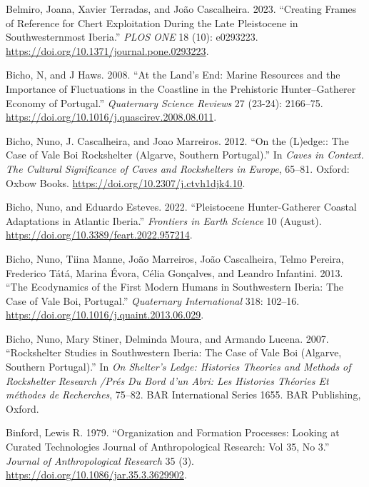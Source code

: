 \documentclass[
  a4paper,
  DIV=11,
  numbers=noendperiod]{scrreprt}
\newlength{\cslhangindent}
\newenvironment{CSLReferences}[2] %
 {\begin{list}{}{%
  \setlength{\itemindent}{0pt}
  \setlength{\leftmargin}{0pt}
  \setlength{\parsep}{0pt}
  \ifodd #1
   \setlength{\leftmargin}{\cslhangindent}
   \setlength{\itemindent}{-1\cslhangindent}
  \fi
  \setlength{\itemsep}{#2\baselineskip}}}
 {\end{list}}
\begin{document}
\begin{CSLReferences}{1}{0}
Belmiro, Joana, Xavier Terradas, and João Cascalheira. 2023. {``Creating
Frames of Reference for Chert Exploitation During the {Late Pleistocene}
in {Southwesternmost Iberia}.''} \emph{PLOS ONE} 18 (10): e0293223.
\url{https://doi.org/10.1371/journal.pone.0293223}.

Bicho, N, and J Haws. 2008. {``At the Land's End: {Marine} Resources and
the Importance of Fluctuations in the Coastline in the Prehistoric
Hunter--Gatherer Economy of {Portugal}.''} \emph{Quaternary Science
Reviews} 27 (23-24): 2166--75.
\url{https://doi.org/10.1016/j.quascirev.2008.08.011}.

Bicho, Nuno, J. Cascalheira, and Joao Marreiros. 2012. {``On the
({L})edge:: {The Case} of {Vale Boi Rockshelter} ({Algarve}, {Southern
Portugal}).''} In \emph{Caves in {Context}. {The Cultural Significance}
of {Caves} and {Rockshelters} in {Europe}}, 65--81. Oxford: Oxbow Books.
\url{https://doi.org/10.2307/j.ctvh1djk4.10}.

Bicho, Nuno, and Eduardo Esteves. 2022. {``Pleistocene Hunter-Gatherer
Coastal Adaptations in {Atlantic Iberia}.''} \emph{Frontiers in Earth
Science} 10 (August). \url{https://doi.org/10.3389/feart.2022.957214}.

Bicho, Nuno, Tiina Manne, João Marreiros, João Cascalheira, Telmo
Pereira, Frederico Tátá, Marina Évora, Célia Gonçalves, and Leandro
Infantini. 2013. {``The Ecodynamics of the First Modern Humans in
{Southwestern Iberia}: {The} Case of {Vale Boi}, {Portugal}.''}
\emph{Quaternary International} 318: 102--16.
\url{https://doi.org/10.1016/j.quaint.2013.06.029}.

Bicho, Nuno, Mary Stiner, Delminda Moura, and Armando Lucena. 2007.
{``Rockshelter Studies in Southwestern {Iberia}: The Case of Vale Boi
({Algarve}, Southern Portugal).''} In \emph{On {Shelter}'s {Ledge}:
{Histories Theories} and {Methods} of {Rockshelter Research} /{Pr{é}s}
Du Bord d'un Abri: {Les} Histories Th{é}ories Et m{é}thodes de
Recherches}, 75--82. {BAR International Series} 1655. BAR Publishing,
Oxford.

Binford, Lewis R. 1979. {``Organization and {Formation Processes}:
{Looking} at {Curated Technologies} {\textbar} {Journal} of
{Anthropological Research}: {Vol} 35, {No} 3.''} \emph{Journal of
Anthropological Research} 35 (3).
\url{https://doi.org/10.1086/jar.35.3.3629902}.


\end{CSLReferences}
\end{document}
